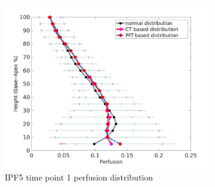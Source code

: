 \begin{figure}[htbp]
\begin{subfigure}{.6\linewidth}
  \includegraphics[width=\linewidth,trim={{.0\wd0} {.0\wd0} {.0\wd0} {.0\wd0}},clip]{Appendix/Image_AppexB/IPF511/IPF511_PerfusionAgainstLungHeight.jpg}
  \caption{IPF5 time point 1 perfusion distribution}
  \label{fig:VQDistribution-b}
\end{subfigure}
\begin{subfigure}{.6\linewidth}%

\end{subfigure}
\end{figure}

